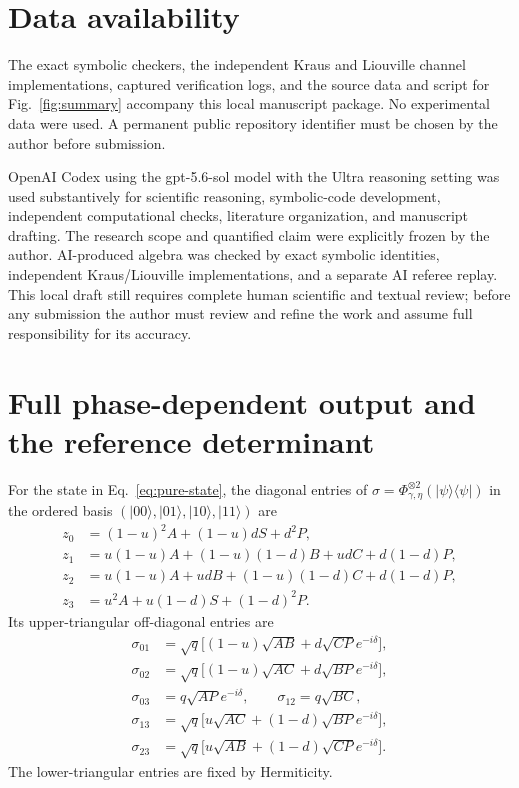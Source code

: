 \documentclass[pra,aps,twocolumn,nofootinbib,superscriptaddress]{revtex4-2}
\begin{document}
\section*{Data availability}

The exact symbolic checkers, the independent Kraus and Liouville channel
implementations, captured verification logs, and the source data and script
for Fig.~\ref{fig:summary} accompany this local manuscript package.  No
experimental data were used.  A permanent public repository identifier must
be chosen by the author before submission.

\begin{acknowledgments}
OpenAI Codex using the gpt-5.6-sol model with the Ultra reasoning setting was
used substantively for scientific reasoning, symbolic-code development,
independent computational checks, literature organization, and manuscript
drafting.  The research scope and quantified claim were explicitly frozen by
the author.  AI-produced algebra was checked by exact symbolic identities,
independent Kraus/Liouville implementations, and a separate AI referee replay.
This local draft still requires complete human scientific and textual review;
before any submission the author must review and refine the work and assume
full responsibility for its accuracy.
\end{acknowledgments}

\appendix

\section{Full phase-dependent output and the reference determinant}
\label{app:output}

For the state in Eq.~\eqref{eq:pure-state}, the diagonal entries of
$\sigma=\Phi_{\gamma,\eta}^{\otimes2}(|\psi\rangle\langle\psi|)$ in the
ordered basis $(|00\rangle,|01\rangle,|10\rangle,|11\rangle)$ are
\begin{align}
z_0&=(1-u)^2A+(1-u)dS+d^2P,\nonumber\\
z_1&=u(1-u)A+(1-u)(1-d)B+udC+d(1-d)P,\nonumber\\
z_2&=u(1-u)A+udB+(1-u)(1-d)C+d(1-d)P,\nonumber\\
z_3&=u^2A+u(1-d)S+(1-d)^2P.
\label{eq:zentries}
\end{align}
Its upper-triangular off-diagonal entries are
\begin{align}
\sigma_{01}&=\sqrt q\bigl[(1-u)\sqrt{AB}+d\sqrt{CP}e^{-i\delta}\bigr],\nonumber\\
\sigma_{02}&=\sqrt q\bigl[(1-u)\sqrt{AC}+d\sqrt{BP}e^{-i\delta}\bigr],\nonumber\\
\sigma_{03}&=q\sqrt{AP}e^{-i\delta},\qquad \sigma_{12}=q\sqrt{BC},\nonumber\\
\sigma_{13}&=\sqrt q\bigl[u\sqrt{AC}+(1-d)\sqrt{BP}e^{-i\delta}\bigr],\nonumber\\
\sigma_{23}&=\sqrt q\bigl[u\sqrt{AB}+(1-d)\sqrt{CP}e^{-i\delta}\bigr].
\label{eq:offdiag}
\end{align}
The lower-triangular entries are fixed by Hermiticity.
\end{document}
